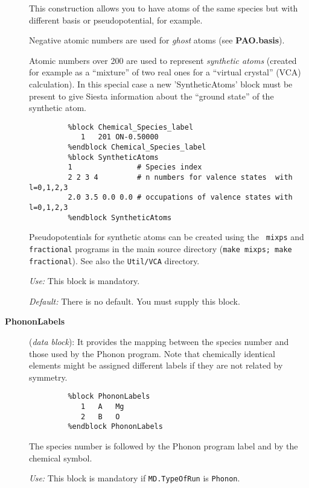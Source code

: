 \documentclass[11pt]{article}
\begin{document}
\begin{description}
This construction allows you to have atoms of the same species but with
different basis or pseudopotential, for example.

Negative atomic numbers are used for {\it ghost} atoms 
(see {\bf PAO.basis}).

Atomic numbers over 200 are used to represent {\it synthetic atoms}
 (created for example as a ``mixture'' of two
real ones for a ``virtual crystal'' (VCA) calculation). In
this special case a new 'SyntheticAtoms' block
  must be present to give
{\sc Siesta} information about the ``ground state'' of the synthetic
atom.

\begin{verbatim}
         %block Chemical_Species_label
            1   201 ON-0.50000
         %endblock Chemical_Species_label
         %block SyntheticAtoms
         1               # Species index
         2 2 3 4         # n numbers for valence states  with l=0,1,2,3
         2.0 3.5 0.0 0.0 # occupations of valence states with l=0,1,2,3
         %endblock SyntheticAtoms
\end{verbatim}

Pseudopotentials for synthetic atoms can be created using the {\tt
  mixps} and  {\tt fractional} programs
 in the main source directory
  ({\tt make mixps; make fractional}). See also the {\tt Util/VCA} directory.

{\it Use:} This block is mandatory.

{\it Default:} There is no default. You must supply this block.

\item[{\bf PhononLabels}] ({\it data block}): 
It provides the mapping 
between the species number and those used by the {\sc
Phonon} program. Note that chemically identical elements might be
assigned different labels if they are not related by symmetry.

\begin{verbatim}
         %block PhononLabels
            1   A   Mg
            2   B   O
         %endblock PhononLabels
\end{verbatim}

The species number is followed by the {\sc
Phonon} program label and by the chemical symbol.

{\it Use:} This block is mandatory if {\tt MD.TypeOfRun} is {\tt Phonon}.


\end{description}
\end{document}
